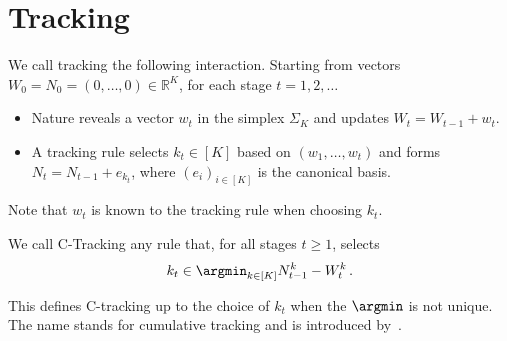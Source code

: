 
\section{Tracking}\label{app:lgc.tracking}

We call tracking the following interaction. Starting from vectors $W_0 = N_0 = (0, \ldots, 0) \in \mathbb{R}^K$, for each stage $t=1,2,\ldots$
\begin{itemize}
	\item Nature reveals a vector $w_t$ in the simplex $\Sigma_K$ and updates $W_t = W_{t-1} + w_t$.
	\item A tracking rule selects $k_t \in [K]$ based on $(w_1, \ldots, w_t)$ and forms $N_t = N_{t-1} + e_{k_t}$, where $(e_i)_{i\in [K]}$ is the canonical basis.
\end{itemize}
Note that $w_t$ is known to the tracking rule when choosing $k_t$.

\begin{definition}
We call C-Tracking any rule that, for all stages $t\ge 1$, selects
\[
    k_t \in \argmin_{k\in [K]} N_{t-1}^k - W_t^k\,.
\]
\end{definition}
This defines C-tracking up to the choice of $k_t$ when the $\argmin$ is not unique. The name stands for cumulative tracking and is introduced by~\citet{garivier2016tracknstop}.

